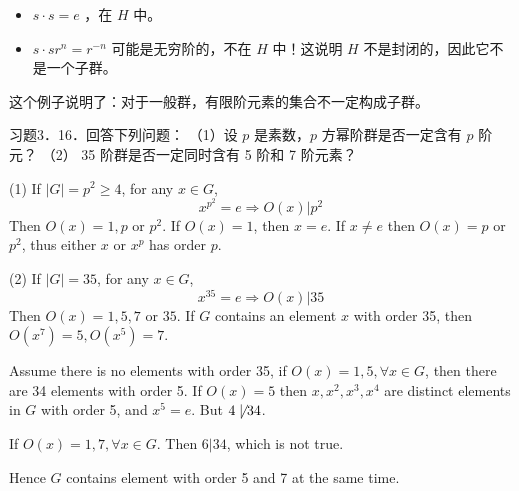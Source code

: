 \begin{itemize}
	\item $s \cdot s=e$ ，在 $H$ 中。
	\item $s \cdot s r^n=r^{-n}$ 可能是无穷阶的，不在 $H$ 中！这说明 $H$ 不是封闭的，因此它不是一个子群。
\end{itemize}

这个例子说明了：对于一般群，有限阶元素的集合不一定构成子群。

\begin{exercise}
习题3．16．回答下列问题：
（1）设 $p$ 是素数，$p$ 方幂阶群是否一定含有 $p$ 阶元？
（2） 35 阶群是否一定同时含有 5 阶和 7 阶元素？
\end{exercise}
(1)
If $\lvert G \rvert=p^{2}\geq4$, for any $x\in G$,
\[
x^{p^{2}}=e\Rightarrow O(x)|p^{2}
\]
Then $O(x)=1,p\text{ or }p^{2}$. If $O(x)=1$, then $x=e$. If $x\neq e$ then $O(x)=p$ or $p^{2}$, thus either $x$ or $x^{p}$ has order $p$.

(2)
If $\lvert G \rvert=35$, for any $x\in G$,
\[
x^{35}=e\Rightarrow O(x)|35
\]
Then $O(x)=1,5,7$ or $35$. If $G$ contains an element $x$ with order 35, then $O(x^{7})=5,O(x^{5})=7$.

Assume there is no elements with order 35, if $O (x)=1,5,\forall x\in G$, then there are 34 elements with order 5. If $O(x)=5$ then $x,x^{2},x^{3},x^{4}$ are distinct elements in $G$ with order 5, and $x^{5}=e$. But $4 \not\mid34$.

If $O (x)=1,7,\forall x\in G$. Then $6|34$, which is not true.

Hence $G$ contains element with order 5 and 7 at the same time.

